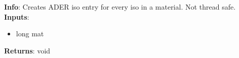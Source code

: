 \textbf{Info}: Creates ADER iso entry for every iso in a material. Not thread
safe. \\

\noindent \textbf{Inputs}:
\begin{itemize}
\item{long mat}
\end{itemize}

\noindent \textbf{Returns}: void
